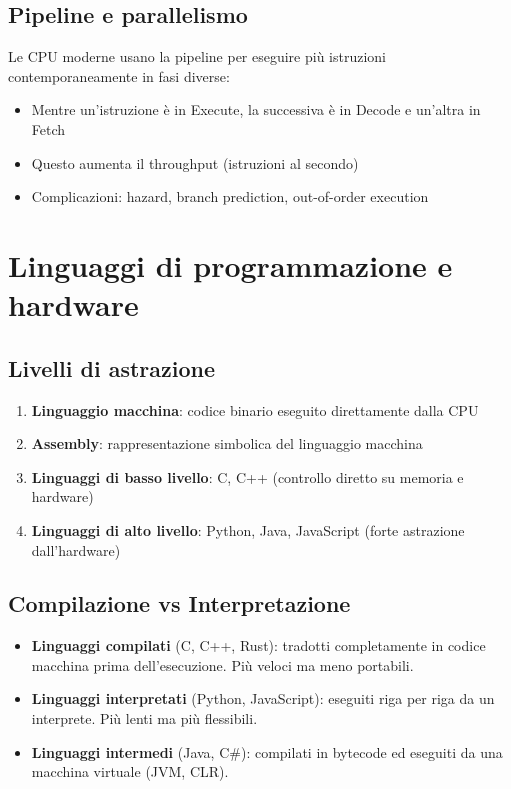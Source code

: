 \documentclass[12pt,a4paper]{article}
\begin{document}
\subsection{Pipeline e parallelismo}
Le CPU moderne usano la pipeline per eseguire più istruzioni contemporaneamente in fasi diverse:
\begin{itemize}
    \item Mentre un'istruzione è in Execute, la successiva è in Decode e un'altra in Fetch
    \item Questo aumenta il throughput (istruzioni al secondo)
    \item Complicazioni: hazard, branch prediction, out-of-order execution
\end{itemize}

\section{Linguaggi di programmazione e hardware}
\subsection{Livelli di astrazione}
\begin{enumerate}
    \item \textbf{Linguaggio macchina}: codice binario eseguito direttamente dalla CPU
    \item \textbf{Assembly}: rappresentazione simbolica del linguaggio macchina
    \item \textbf{Linguaggi di basso livello}: C, C++ (controllo diretto su memoria e hardware)
    \item \textbf{Linguaggi di alto livello}: Python, Java, JavaScript (forte astrazione dall'hardware)
\end{enumerate}

\subsection{Compilazione vs Interpretazione}
\begin{itemize}
    \item \textbf{Linguaggi compilati} (C, C++, Rust): tradotti completamente in codice macchina prima dell'esecuzione. Più veloci ma meno portabili.
    \item \textbf{Linguaggi interpretati} (Python, JavaScript): eseguiti riga per riga da un interprete. Più lenti ma più flessibili.
    \item \textbf{Linguaggi intermedi} (Java, C\#): compilati in bytecode ed eseguiti da una macchina virtuale (JVM, CLR).
\end{itemize}
\end{document}
